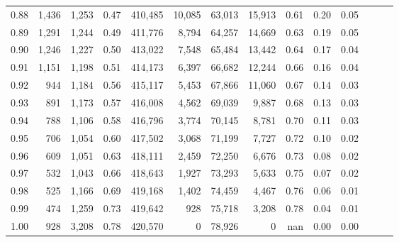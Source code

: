 \begin{tabular}{rrrrrrrrrrrrrr}
0.88 &   1,436 &  1,253 &  0.47 &  410,485 &   10,085 &  63,013 &  15,913 &  0.61 &  0.20 &      0.05 \\
0.89 &   1,291 &  1,244 &  0.49 &  411,776 &    8,794 &  64,257 &  14,669 &  0.63 &  0.19 &      0.05 \\
0.90 &   1,246 &  1,227 &  0.50 &  413,022 &    7,548 &  65,484 &  13,442 &  0.64 &  0.17 &      0.04 \\
0.91 &   1,151 &  1,198 &  0.51 &  414,173 &    6,397 &  66,682 &  12,244 &  0.66 &  0.16 &      0.04 \\
0.92 &     944 &  1,184 &  0.56 &  415,117 &    5,453 &  67,866 &  11,060 &  0.67 &  0.14 &      0.03 \\
0.93 &     891 &  1,173 &  0.57 &  416,008 &    4,562 &  69,039 &   9,887 &  0.68 &  0.13 &      0.03 \\
0.94 &     788 &  1,106 &  0.58 &  416,796 &    3,774 &  70,145 &   8,781 &  0.70 &  0.11 &      0.03 \\
0.95 &     706 &  1,054 &  0.60 &  417,502 &    3,068 &  71,199 &   7,727 &  0.72 &  0.10 &      0.02 \\
0.96 &     609 &  1,051 &  0.63 &  418,111 &    2,459 &  72,250 &   6,676 &  0.73 &  0.08 &      0.02 \\
0.97 &     532 &  1,043 &  0.66 &  418,643 &    1,927 &  73,293 &   5,633 &  0.75 &  0.07 &      0.02 \\
0.98 &     525 &  1,166 &  0.69 &  419,168 &    1,402 &  74,459 &   4,467 &  0.76 &  0.06 &      0.01 \\
0.99 &     474 &  1,259 &  0.73 &  419,642 &      928 &  75,718 &   3,208 &  0.78 &  0.04 &      0.01 \\
1.00 &     928 &  3,208 &  0.78 &  420,570 &        0 &  78,926 &       0 &   nan &  0.00 &      0.00 \\
\bottomrule
\end{tabular}
